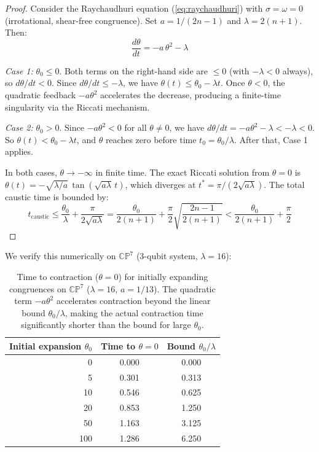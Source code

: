 \documentclass[12pt,a4paper]{article}
\begin{document}
\begin{proof}
Consider the Raychaudhuri equation (\ref{eq:raychaudhuri}) with $\sigma = \omega = 0$ (irrotational, shear-free congruence). Set $a = 1/(2n-1)$ and $\lambda = 2(n+1)$. Then:
\begin{equation}
    \frac{d\theta}{dt} = -a\,\theta^2 - \lambda
    \label{eq:ray_simple}
\end{equation}

\textit{Case 1:} $\theta_0 \leq 0$. Both terms on the right-hand side are $\leq 0$ (with $-\lambda < 0$ always), so $d\theta/dt < 0$. Since $d\theta/dt \leq -\lambda$, we have $\theta(t) \leq \theta_0 - \lambda t$. Once $\theta < 0$, the quadratic feedback $-a\theta^2$ accelerates the decrease, producing a finite-time singularity via the Riccati mechanism.

\textit{Case 2:} $\theta_0 > 0$. Since $-a\theta^2 < 0$ for all $\theta \neq 0$, we have $d\theta/dt = -a\theta^2 - \lambda < -\lambda < 0$. So $\theta(t) < \theta_0 - \lambda t$, and $\theta$ reaches zero before time $t_0 = \theta_0/\lambda$. After that, Case 1 applies.

In both cases, $\theta \to -\infty$ in finite time. The exact Riccati solution from $\theta = 0$ is $\theta(t) = -\sqrt{\lambda/a}\,\tan(\sqrt{a\lambda}\,t)$, which diverges at $t^* = \pi/(2\sqrt{a\lambda})$. The total caustic time is bounded by:
\begin{equation}
    t_{\text{caustic}} \leq \frac{\theta_0}{\lambda} + \frac{\pi}{2\sqrt{a\lambda}} = \frac{\theta_0}{2(n+1)} + \frac{\pi}{2}\sqrt{\frac{2n-1}{2(n+1)}} < \frac{\theta_0}{2(n+1)} + \frac{\pi}{2}
\end{equation}
\end{proof}

We verify this numerically on $\mathbb{CP}^7$ (3-qubit system, $\lambda = 16$):

\begin{table}[H]
\centering
\begin{tabular}{rcc}
\toprule
Initial expansion $\theta_0$ & Time to $\theta = 0$ & Bound $\theta_0/\lambda$ \\
\midrule
0 & 0.000 & 0.000 \\
5 & 0.301 & 0.313 \\
10 & 0.546 & 0.625 \\
20 & 0.853 & 1.250 \\
50 & 1.163 & 3.125 \\
100 & 1.286 & 6.250 \\
\bottomrule
\end{tabular}
\caption{Time to contraction ($\theta = 0$) for initially expanding congruences on $\mathbb{CP}^7$ ($\lambda = 16$, $a = 1/13$). The quadratic term $-a\theta^2$ accelerates contraction beyond the linear bound $\theta_0/\lambda$, making the actual contraction time significantly shorter than the bound for large $\theta_0$.}
\label{tab:expansion}
\end{table}
\end{document}
